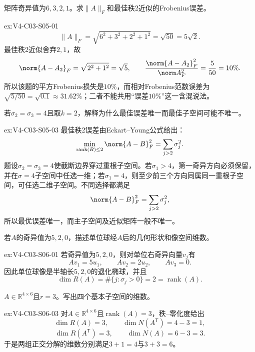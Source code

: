 \begin{SLChapterExercisePairSection}
\begin{exercise}\label{ex:V4-C03-S05-01}
矩阵奇异值为$6,3,2,1$。求$\|A\|_F$和最佳秩2近似的Frobenius误差。
\end{exercise}
\ifSLFullEdition
{}\label{sol:V4-C03-S05-01}
\begin{chapterexercisesolution}{ex:V4-C03-S05-01}
\[
\|A\|_F=\sqrt{6^2+3^2+2^2+1^2}=\sqrt{50}=5\sqrt2.
\]
最佳秩2近似舍弃$2,1$，故
\[
\norm{A-A_2}_F
=\sqrt{2^2+1^2}=\sqrt5,
\qquad
\frac{\norm{A-A_2}_F^2}{\norm A_F^2}
=\frac5{50}=10\%.
\]
所以该题的平方Frobenius损失是$10\%$，而相对Frobenius范数误差为
$\sqrt{5/50}=\sqrt{0.1}\approx31.62\%$；二者不能共用“误差$10\%$”这一含混说法。
\end{chapterexercisesolution}
\fi

\begin{exercise}\label{ex:V4-C03-S05-03}
若$\sigma_2=\sigma_3=4$且取$k=2$，解释为什么最佳误差唯一而最佳子空间可能不唯一。
\end{exercise}
\ifSLFullEdition
{}\label{sol:V4-C03-S05-03}
\begin{chapterexercisesolution}{ex:V4-C03-S05-03}
最佳秩2误差由Eckart--Young公式给出：
\[
\min_{\operatorname{rank}(B)\le2}\norm{A-B}_F^2
=\sum_{j>2}\sigma_j^2.
\]
题设$\sigma_2=\sigma_3=4$使截断边界穿过重根子空间。若$\sigma_1>4$，第一奇异方向必须保留，并在$\sigma=4$子空间中任选一维；若$\sigma_1=4$，则至少前三个方向同属同一重根子空间，可任选二维子空间。不同选择都满足
\[
\norm{A-B}_F^2=\sum_{j>2}\sigma_j^2,
\]
所以最优误差唯一，而主子空间及近似矩阵一般不唯一。
\end{chapterexercisesolution}
\fi

\begin{exercise}\label{ex:V4-C03-S06-01}
若$A$的奇异值为$5,2,0$，描述单位球经$A$后的几何形状和像空间维数。
\end{exercise}
\ifSLFullEdition
{}\label{sol:V4-C03-S06-01}
\begin{chapterexercisesolution}{ex:V4-C03-S06-01}
若奇异值为$5,2,0$，则对单位右奇异向量$v_j$有
\[
Av_1=5u_1,
\qquad
Av_2=2u_2,
\qquad
Av_3=0.
\]
因此单位球像是半轴长$5,2,0$的退化椭球，并且
\[
\dim R(A)=\#\{j:\sigma_j>0\}=2
=\operatorname{rank}(A).
\]
\end{chapterexercisesolution}
\fi

\begin{exercise}\label{ex:V4-C03-S06-03}
$A\in\mathbb R^{4\times6}$且$r=3$。写出四个基本子空间的维数。
\end{exercise}
\ifSLFullEdition
{}\label{sol:V4-C03-S06-03}
\begin{chapterexercisesolution}{ex:V4-C03-S06-03}
对$A\in\mathbb R^{4\times6}$且$\operatorname{rank}(A)=3$，秩--零化度给出
\[
\dim R(A)=3,
\qquad
\dim N(A^{\mathsf T})=4-3=1,
\]
\[
\dim R(A^{\mathsf T})=3,
\qquad
\dim N(A)=6-3=3.
\]
于是两组正交分解的维数分别满足$3+1=4$与$3+3=6$。
\end{chapterexercisesolution}
\fi


\end{SLChapterExercisePairSection}
